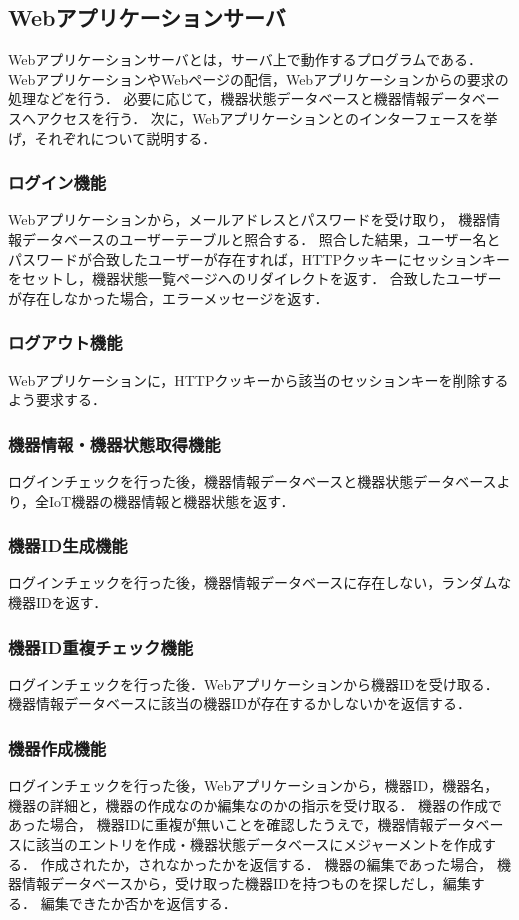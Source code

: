 \subsection{Webアプリケーションサーバ}
Webアプリケーションサーバとは，サーバ上で動作するプログラムである．
WebアプリケーションやWebページの配信，Webアプリケーションからの要求の処理などを行う．
必要に応じて，機器状態データベースと機器情報データベースへアクセスを行う．
次に，Webアプリケーションとのインターフェースを挙げ，それぞれについて説明する．
\subsubsection{ログイン機能}
Webアプリケーションから，メールアドレスとパスワードを受け取り，	機器情報データベースのユーザーテーブルと照合する．
照合した結果，ユーザー名とパスワードが合致したユーザーが存在すれば，HTTPクッキーにセッションキーをセットし，機器状態一覧ページへのリダイレクトを返す．
合致したユーザーが存在しなかった場合，エラーメッセージを返す．
\subsubsection{ログアウト機能}
Webアプリケーションに，HTTPクッキーから該当のセッションキーを削除するよう要求する．
\subsubsection{機器情報・機器状態取得機能}
ログインチェックを行った後，機器情報データベースと機器状態データベースより，全IoT機器の機器情報と機器状態を返す．
\subsubsection{機器ID生成機能}
ログインチェックを行った後，機器情報データベースに存在しない，ランダムな機器IDを返す．
\subsubsection{機器ID重複チェック機能}
ログインチェックを行った後．Webアプリケーションから機器IDを受け取る．
機器情報データベースに該当の機器IDが存在するかしないかを返信する．
\subsubsection{機器作成機能}
ログインチェックを行った後，Webアプリケーションから，機器ID，機器名，機器の詳細と，機器の作成なのか編集なのかの指示を受け取る．
機器の作成であった場合，
機器IDに重複が無いことを確認したうえで，機器情報データベースに該当のエントリを作成・機器状態データベースにメジャーメントを作成する．
作成されたか，されなかったかを返信する．
機器の編集であった場合，
機器情報データベースから，受け取った機器IDを持つものを探しだし，編集する．
編集できたか否かを返信する．
